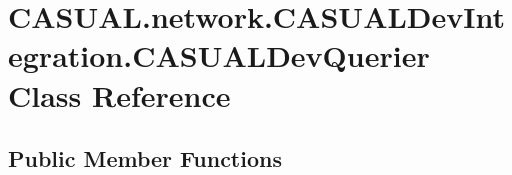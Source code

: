 \hypertarget{class_c_a_s_u_a_l_1_1network_1_1_c_a_s_u_a_l_dev_integration_1_1_c_a_s_u_a_l_dev_querier}{\section{C\-A\-S\-U\-A\-L.\-network.\-C\-A\-S\-U\-A\-L\-Dev\-Integration.\-C\-A\-S\-U\-A\-L\-Dev\-Querier Class Reference}
\label{class_c_a_s_u_a_l_1_1network_1_1_c_a_s_u_a_l_dev_integration_1_1_c_a_s_u_a_l_dev_querier}
}
\subsection*{Public Member Functions}

